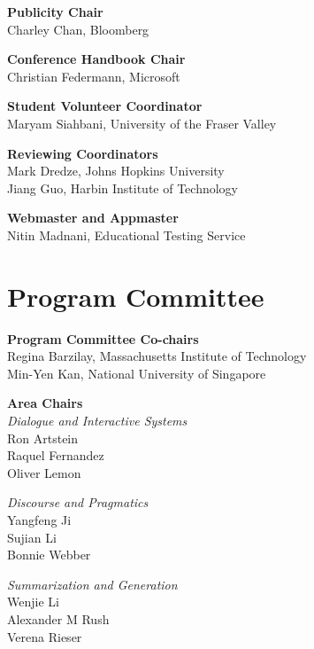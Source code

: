 {\bf Publicity Chair} \\
Charley Chan, Bloomberg

{\bf Conference Handbook Chair} \\
Christian Federmann, Microsoft

{\bf Student Volunteer Coordinator} \\
Maryam Siahbani, University of the Fraser Valley

{\bf Reviewing Coordinators} \\
Mark Dredze, Johns Hopkins University \\
Jiang Guo, Harbin Institute of Technology

{\bf Webmaster and Appmaster} \\
Nitin Madnani, Educational Testing Service


\clearpage
\section{Program Committee}
\setlength{\parindent}{0pt}

\vspace*{0.5cm}

{\bf Program Committee Co-chairs} \\
Regina Barzilay, Massachusetts Institute of Technology \\
Min-Yen Kan, National University of Singapore

{\bf Area Chairs} \\
\emph{Dialogue and Interactive Systems} \\
\hspace*{0.2in} Ron Artstein \\
\hspace*{0.2in} Raquel Fernandez \\
\hspace*{0.2in} Oliver Lemon

\emph{Discourse and Pragmatics} \\
\hspace*{0.2in} Yangfeng Ji \\
\hspace*{0.2in} Sujian Li \\
\hspace*{0.2in} Bonnie Webber
 
\emph{Summarization and Generation} \\
\hspace*{0.2in} Wenjie Li \\
\hspace*{0.2in} Alexander M Rush \\
\hspace*{0.2in} Verena Rieser

